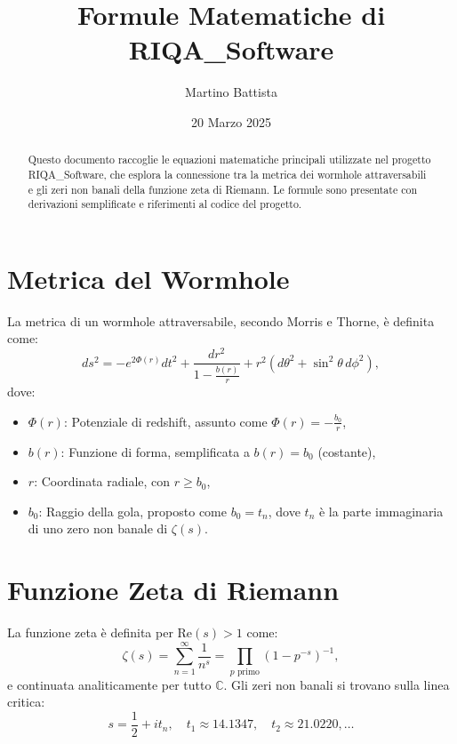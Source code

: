 \documentclass[11pt]{article}
\begin{document}
\title{Formule Matematiche di RIQA\_Software}
\author{Martino Battista}
\date{20 Marzo 2025}
\maketitle

\begin{abstract}
Questo documento raccoglie le equazioni matematiche principali utilizzate nel progetto RIQA\_Software, che esplora la connessione tra la metrica dei wormhole attraversabili e gli zeri non banali della funzione zeta di Riemann. Le formule sono presentate con derivazioni semplificate e riferimenti al codice del progetto.
\end{abstract}

\section{Metrica del Wormhole}
La metrica di un wormhole attraversabile, secondo Morris e Thorne, è definita come:
\begin{equation}
ds^2 = -e^{2\Phi(r)} dt^2 + \frac{dr^2}{1 - \frac{b(r)}{r}} + r^2 (d\theta^2 + \sin^2\theta \, d\phi^2),
\label{eq:metric}
\end{equation}
dove:
\begin{itemize}
    \item \( \Phi(r) \): Potenziale di redshift, assunto come \( \Phi(r) = -\frac{b_0}{r} \),
    \item \( b(r) \): Funzione di forma, semplificata a \( b(r) = b_0 \) (costante),
    \item \( r \): Coordinata radiale, con \( r \geq b_0 \),
    \item \( b_0 \): Raggio della gola, proposto come \( b_0 = t_n \), dove \( t_n \) è la parte immaginaria di uno zero non banale di \( \zeta(s) \).
\end{itemize}

\section{Funzione Zeta di Riemann}
La funzione zeta è definita per \( \text{Re}(s) > 1 \) come:
\begin{equation}
\zeta(s) = \sum_{n=1}^\infty \frac{1}{n^s} = \prod_{p \text{ primo}} \left(1 - p^{-s}\right)^{-1},
\label{eq:zeta}
\end{equation}
e continuata analiticamente per tutto \( \mathbb{C} \). Gli zeri non banali si trovano sulla linea critica:
\begin{equation}
s = \frac{1}{2} + i t_n, \quad t_1 \approx 14.1347, \quad t_2 \approx 21.0220, \ldots
\label{eq:zeros}
\end{equation}
\end{document}
